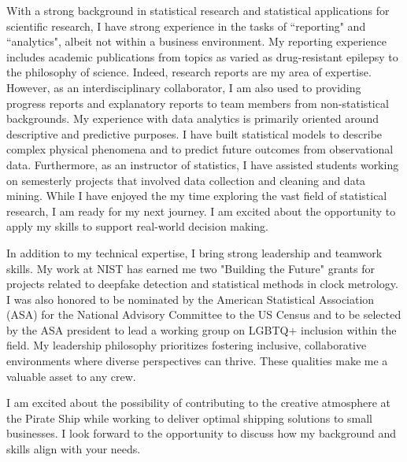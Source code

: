 \documentclass[11pt,a4paper,sans]{moderncv}
\begin{document}
With a strong background in statistical research and statistical applications for scientific research, I have strong experience in the tasks of ``reporting" and ``analytics", albeit not within a business environment. My reporting experience includes academic publications from topics as varied as drug-resistant epilepsy to the philosophy of science. Indeed, research reports are my area of expertise. However, as an interdisciplinary collaborator, I am also used to providing progress reports and explanatory reports to team members from non-statistical backgrounds. My experience with data analytics is primarily oriented around descriptive and predictive purposes. I have built statistical models to describe complex physical phenomena and to predict future outcomes from observational data. Furthermore, as an instructor of statistics, I have assisted students working on semesterly projects that involved data collection and cleaning and data mining. While I have enjoyed the my time exploring the vast field of statistical research, I am ready for my next journey. I am excited about the opportunity to apply my skills to support real-world decision making. 

In addition to my technical expertise, I bring strong leadership and teamwork skills. My work at NIST has earned me two "Building the Future" grants for projects related to deepfake detection and statistical methods in clock metrology. I was also honored to be nominated by the American Statistical Association (ASA) for the National Advisory Committee to the US Census and to be selected by the ASA president to lead a working group on LGBTQ+ inclusion within the field. My leadership philosophy prioritizes fostering inclusive, collaborative environments where diverse perspectives can thrive. These qualities make me a valuable asset to any crew.

I am excited about the possibility of contributing to the creative atmosphere at the Pirate Ship while working to deliver optimal shipping solutions to small businesses. I look forward to the opportunity to discuss how my background and skills align with your needs. 
	
	\vspace{2mm}
	
	\makeletterclosing
	
\end{document}
